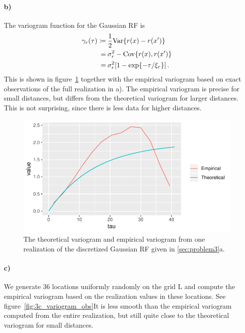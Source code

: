 \paragraph{b)}
The variogram function for the Gaussian RF is
%
\begin{align*}
\gamma_r(\tau)
\coloneqq&\: \frac{1}{2} \mathrm{Var} \{ r(x) - r(x') \} \\
=&\: \sigma_r^2 - \mathrm{Cov}\{r(x), r(x')\} \\
=&\: \sigma_r^2 [1 - \exp\{-\tau/\xi_r\}] \, .
\end{align*}
%
This is shown in figure~\ref{fig:3b_variogram} together with the empirical variogram based on exact observations of the full realization in a). The empirical variogram is precise for small distances, but differs from the theoretical variogram for larger distances. This is not surprising, since there is less data for higher distances.

\begin{figure}
    \centering
    \includegraphics[scale=0.95]{figures/3b_variogram.pdf}
    \caption{The theoretical variogram and empirical variogram from one realization of the discretized Gaussian RF given in \ref{sec:problem3}a.}
    \label{fig:3b_variogram}
\end{figure}

\paragraph{c)}
We generate 36 locations uniformly randomly on the grid $\mathrm{L}$ and compute the empirical variogram based on the realization values in these locations. See figure~\ref{fig:3c_variogram_obs}It is less smooth than the empirical variogram computed from the entire realization, but still quite close to the theoretical variogram for small distances.

